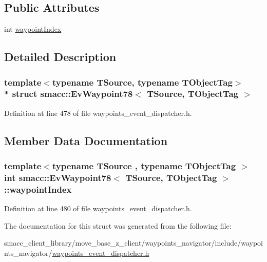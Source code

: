 \subsection*{Public Attributes}
\begin{DoxyCompactItemize}
\item 
int \hyperlink{structsmacc_1_1EvWaypoint78_a6033fd9c2355dbc7a35a0533bc2e3d41}{waypoint\+Index}
\end{DoxyCompactItemize}


\subsection{Detailed Description}
\subsubsection*{template$<$typename T\+Source, typename T\+Object\+Tag$>$\\*
struct smacc\+::\+Ev\+Waypoint78$<$ T\+Source, T\+Object\+Tag $>$}



Definition at line 478 of file waypoints\+\_\+event\+\_\+dispatcher.\+h.



\subsection{Member Data Documentation}
\subsubsection[{\texorpdfstring{waypoint\+Index}{waypointIndex}}]{\setlength{\rightskip}{0pt plus 5cm}template$<$typename T\+Source , typename T\+Object\+Tag $>$ int {\bf smacc\+::\+Ev\+Waypoint78}$<$ T\+Source, T\+Object\+Tag $>$\+::waypoint\+Index}\hypertarget{structsmacc_1_1EvWaypoint78_a6033fd9c2355dbc7a35a0533bc2e3d41}{}\label{structsmacc_1_1EvWaypoint78_a6033fd9c2355dbc7a35a0533bc2e3d41}


Definition at line 480 of file waypoints\+\_\+event\+\_\+dispatcher.\+h.



The documentation for this struct was generated from the following file\+:\begin{DoxyCompactItemize}
\item 
smacc\+\_\+client\+\_\+library/move\+\_\+base\+\_\+z\+\_\+client/waypoints\+\_\+navigator/include/waypoints\+\_\+navigator/\hyperlink{waypoints__event__dispatcher_8h}{waypoints\+\_\+event\+\_\+dispatcher.\+h}\end{DoxyCompactItemize}
